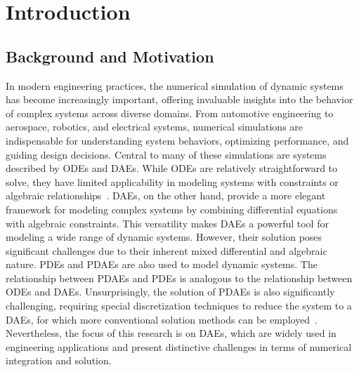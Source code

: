 
\chapter{Introduction}
\label{chap1:introduction}


\section{Background and Motivation}

In modern engineering practices, the numerical simulation of dynamic systems has become increasingly important, offering invaluable insights into the behavior of complex systems across diverse domains. From automotive engineering to aerospace, robotics, and electrical systems, numerical simulations are indispensable for understanding system behaviors, optimizing performance, and guiding design decisions. Central to many of these simulations are systems described by \acp{ODE} and \acp{DAE}. While \acp{ODE} are relatively straightforward to solve, they have limited applicability in modeling systems with constraints or algebraic relationships~\cite{brenan1995numerical}. \acp{DAE}, on the other hand, provide a more elegant framework for modeling complex systems by combining differential equations with algebraic constraints. This versatility makes \acp{DAE} a powerful tool for modeling a wide range of dynamic systems. However, their solution poses significant challenges due to their inherent mixed differential and algebraic nature. \acp{PDE} and \acp{PDAE} are also used to model dynamic systems. The relationship between \acp{PDAE} and \acp{PDE} is analogous to the relationship between \acp{ODE} and \acp{DAE}. Unsurprisingly, the solution of \acp{PDAE} is also significantly challenging, requiring special discretization techniques to reduce the system to a \acp{DAE}, for which more conventional solution methods can be employed~\cite{dedieuleveult2009global}. Nevertheless, the focus of this research is on \acp{DAE}, which are widely used in engineering applications and present distinctive challenges in terms of numerical integration and solution.

